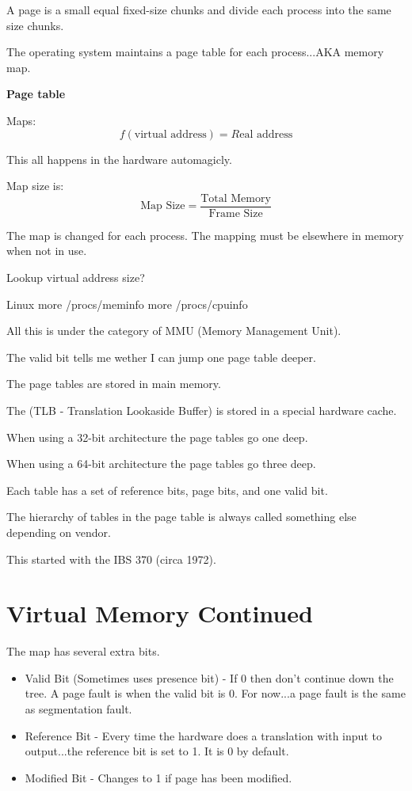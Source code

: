 \documentclass{article}
\begin{document}
A page is a small equal fixed-size chunks and divide each process into the same size chunks.

The operating system maintains a page table for each process...AKA memory map.

{\bf Page table}

Maps:
$$
f(\textrm{virtual address}) = R\textrm{eal address}
$$

This all happens in the hardware automagicly.

Map size is:
$$
\textrm{Map Size} = \frac{\textrm{Total Memory}}{\textrm{Frame Size}}
$$

The map is changed for each process. The mapping must be elsewhere in memory when not in use.

Lookup virtual address size?

Linux
\textrm{more /procs/meminfo}
\textrm{more /procs/cpuinfo}

All this is under the category of MMU (Memory Management Unit).

The valid bit tells me wether I can jump one page table deeper.

The page tables are stored in main memory.

The (TLB - Translation Lookaside Buffer) is stored in a special hardware cache.

When using a 32-bit architecture the page tables go one deep.

When using a 64-bit architecture the page tables go three deep.

Each table has a set of reference bits, page bits, and one valid bit.

The hierarchy of tables in the page table is always called something else depending on vendor.

This started with the IBS 370 (circa 1972).

\section{Virtual Memory Continued}

The map has several extra bits.
\begin{itemize}
\item Valid Bit (Sometimes uses presence bit) - 
  If 0 then don't continue down the tree.
  A page fault is when the valid bit is 0.
  For now...a page fault is the same as segmentation fault.
\item Reference Bit -
  Every time the hardware does a translation with input to output...the reference bit is set to 1.
  It is 0 by default.
\item Modified Bit -
  Changes to 1 if page has been modified. 
\end{itemize}
\end{document}
